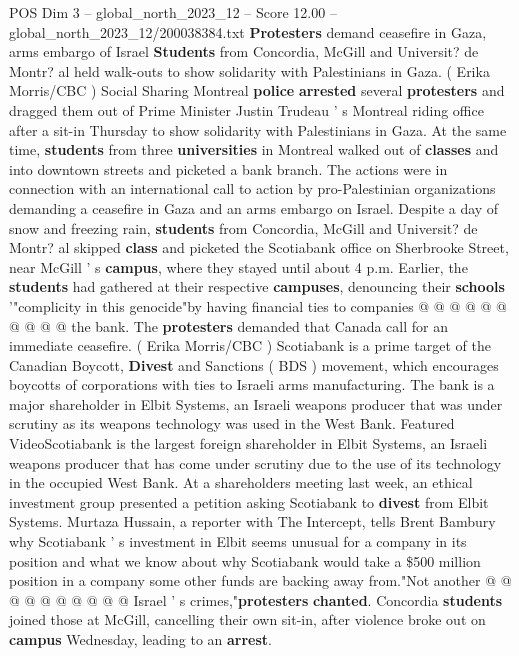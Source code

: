 \begin{textsample}{POS Dim 3 – global\_north\_2023\_12 – Score 12.00 – global\_north\_2023\_12/200038384.txt}  \label{ex:f3_pos_268}
\textbf{Protesters} demand ceasefire in Gaza, arms embargo of Israel \textbf{Students} from Concordia, McGill and Universit? de Montr? al held walk-outs to show solidarity with Palestinians in Gaza. ( Erika Morris/CBC ) Social Sharing Montreal \textbf{police} \textbf{arrested} several \textbf{protesters} and dragged them out of Prime Minister Justin Trudeau ' s Montreal riding office after a sit-in Thursday to show solidarity with Palestinians in Gaza.
At the same time, \textbf{students} from three \textbf{universities} in Montreal walked out of \textbf{classes} and into downtown streets and picketed a bank branch.
The actions were in connection with an international call to action by pro-Palestinian organizations demanding a ceasefire in Gaza and an arms embargo on Israel.
Despite a day of snow and freezing rain, \textbf{students} from Concordia, McGill and Universit? de Montr? al skipped \textbf{class} and picketed the Scotiabank office on Sherbrooke Street, near McGill ' s \textbf{campus}, where they stayed until about 4 p.m.
Earlier, the \textbf{students} had gathered at their respective \textbf{campuses}, denouncing their \textbf{schools} '"complicity in this genocide"by having financial ties to companies @ @ @ @ @ @ @ @ @ @ the bank.
The \textbf{protesters} demanded that Canada call for an immediate ceasefire. ( Erika Morris/CBC ) Scotiabank is a prime target of the Canadian Boycott, \textbf{Divest} and Sanctions ( BDS ) movement, which encourages boycotts of corporations with ties to Israeli arms manufacturing.
The bank is a major shareholder in Elbit Systems, an Israeli weapons producer that was under scrutiny as its weapons technology was used in the West Bank.
Featured VideoScotiabank is the largest foreign shareholder in Elbit Systems, an Israeli weapons producer that has come under scrutiny due to the use of its technology in the occupied West Bank.
At a shareholders meeting last week, an ethical investment group presented a petition asking Scotiabank to \textbf{divest} from Elbit Systems.
Murtaza Hussain, a reporter with The Intercept, tells Brent Bambury why Scotiabank ' s investment in Elbit seems unusual for a company in its position and what we know about why Scotiabank would take a \$500 million position in a company some other funds are backing away from."Not another @ @ @ @ @ @ @ @ @ @ Israel ' s crimes,"\textbf{protesters} \textbf{chanted}.
Concordia \textbf{students} joined those at McGill, cancelling their own sit-in, after violence broke out on \textbf{campus} Wednesday, leading to an \textbf{arrest}.

\end{textsample}
